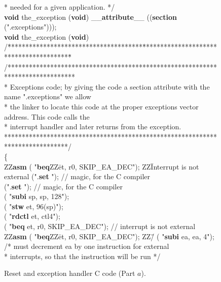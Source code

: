 \begin{figure}[h!]
\begin{center}
\begin{minipage}[t]{12.5 cm}
\begin{tabbing}
\>* needed for a given application. */\\
{\bf void} the\_exception ({\bf void}) \_\_{\bf attribute}\_\_ (({\bf section} (".exceptions")));\\
{\bf void} the\_exception ({\bf void})\\
/\=**************************************\=****************************************\=\kill
/*******************************************************************************\\
\>* Exceptions code; by giving the code a section attribute with the name ".exceptions" we allow\\
\>* the linker to locate this code at the proper exceptions vector address. This code calls the\\
\>* interrupt handler and later returns from the exception.\\
\>******************************************************************************/\\
\{\\
ZZ\={\bf asm} ( "{\bf beq}ZZ\=et, r0, SKIP\_EA\_DEC"); ZZ\= Interrupt is not external\kill 
{} (".{\bf set} "); \>// magic, for the C compiler\\
 (".{\bf set} "); \>// magic, for the C compiler\\
 ( "{\bf subi} \>sp, sp, 128");\\
 ( "{\bf stw} \>et, 96(sp)");\\
 ( "{\bf rdctl}	\>et, ctl4");\\
 ( "{\bf beq} \>et, r0, SKIP\_EA\_DEC"); \>// interrupt is not external\\
ZZ\={\bf asm} ( "{\bf beq}ZZ\=et, r0, SKIP\_EA\_DEC"); ZZ\=/\=\kill 
{} ( "{\bf subi} \>ea, ea, 4"); \>/* must decrement ea by one instruction for external\\
\>\>\>\>* interrupts, so that the instruction will be run */\\
\end{tabbing}
\end{minipage}
\end{center}
	\vspace{-0.33in}\caption{Reset and exception handler C code (Part $a$).}
   \label{fig:exception_handler_C}
\end{figure}
\pagebreak
\clearpage
\newpage

